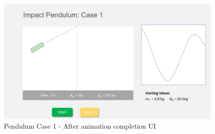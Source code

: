 \begin{figure}[H]
  \includegraphics[width=5.5 in]{pendulum_case_1_2.png}
  \caption{Pendulum Case 1 - After animation completion UI}
  \label{fig:case1_end}
\end{figure}


